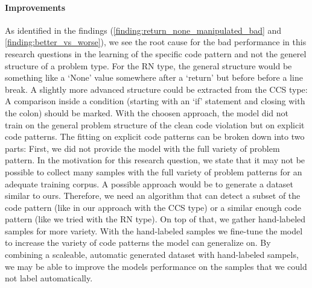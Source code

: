 \paragraph{Improvements}
As identified in the findings (\ref{finding:return_none_manipulated_bad} and \ref{finding:better_vs_worse}), we see the root cause for the bad performance in this research questions in the learning of the specific code pattern and not the generel structure of a problem type. For the RN type, the general structure would be something like a \enquote*{None} value somewhere after a \enquote*{return} but before before a line break. A slightly more advanced structure could be extracted from the CCS type: A comparison inside a condition (starting with an \enquote*{if} statement and closing with the colon) should be marked. With the choosen approach, the model did not train on the general problem structure of the clean code violation but on explicit code patterns. The fitting on explicit code patterns can be broken down into two parts:
First, we did not provide the model with the full variety of problem pattern. In the motivation for this research question, we state that it may not be possible to collect many samples with the full variety of problem patterns for an adequate training corpus. A possible approach would be to generate a dataset similar to ours. Therefore, we need an algorithm that can detect a subset of the code pattern (like in our approach with the CCS type) or a similar enough code pattern (like we tried with the RN type). On top of that, we gather hand-labeled samples for more variety. With the hand-labeled samples we fine-tune the model to increase the variety of code patterns the model can generalize on. By combining a scaleable, automatic generated dataset with hand-labeled sampels, we may be able to improve the models performance on the samples that we could not label automatically.

